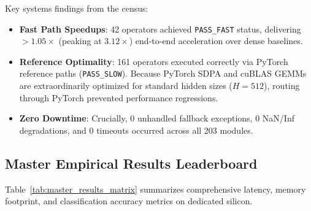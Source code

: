 \documentclass{article}
\newcommand{\passfast}{\texttt{PASS\_FAST}}
\newcommand{\passslow}{\texttt{PASS\_SLOW}}
\begin{document}
Key systems findings from the census:
\begin{itemize}
    \item \textbf{Fast Path Speedups}: 42 operators achieved \passfast{} status, delivering $>1.05\times$ (peaking at $3.12\times$) end-to-end acceleration over dense baselines.
    \item \textbf{Reference Optimality}: 161 operators executed correctly via PyTorch reference paths (\passslow{}). Because PyTorch SDPA and cuBLAS GEMMs are extraordinarily optimized for standard hidden sizes ($H=512$), routing through PyTorch prevented performance regressions.
    \item \textbf{Zero Downtime}: Crucially, 0 unhandled fallback exceptions, 0 NaN/Inf degradations, and 0 timeouts occurred across all 203 modules.
\end{itemize}

\subsection{Master Empirical Results Leaderboard}
Table~\ref{tab:master_results_matrix} summarizes comprehensive latency, memory footprint, and classification accuracy metrics on dedicated silicon.
\end{document}
